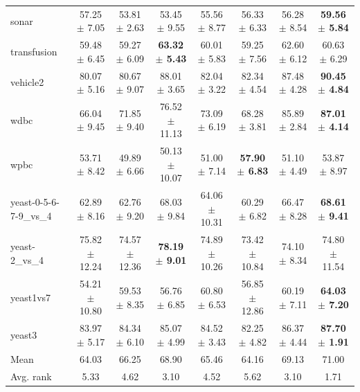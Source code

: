 \begin{table}[t]
\begin{tabular}{lccccccc}
sonar & 57.25 $\pm$ 7.05 & 53.81 $\pm$ 2.63 & 53.45 $\pm$ 9.55 & 55.56 $\pm$ 8.77 & 56.33 $\pm$ 6.33 & 56.28 $\pm$ 8.54 & \textbf{59.56 $\pm$ 5.84} \\
transfusion & 59.48 $\pm$ 6.45 & 59.27 $\pm$ 6.09 & \textbf{63.32 $\pm$ 5.43} & 60.01 $\pm$ 5.83 & 59.25 $\pm$ 7.56 & 62.60 $\pm$ 6.12 & 60.63 $\pm$ 6.29 \\
vehicle2 & 80.07 $\pm$ 5.16 & 80.67 $\pm$ 9.07 & 88.01 $\pm$ 3.65 & 82.04 $\pm$ 3.22 & 82.34 $\pm$ 4.54 & 87.48 $\pm$ 4.28 & \textbf{90.45 $\pm$ 4.84} \\
wdbc & 66.04 $\pm$ 9.45 & 71.85 $\pm$ 9.40 & 76.52 $\pm$ 11.13 & 73.09 $\pm$ 6.19 & 68.28 $\pm$ 3.81 & 85.89 $\pm$ 2.84 & \textbf{87.01 $\pm$ 4.14} \\
wpbc & 53.71 $\pm$ 8.42 & 49.89 $\pm$ 6.66 & 50.13 $\pm$ 10.07 & 51.00 $\pm$ 7.14 & \textbf{57.90 $\pm$ 6.83} & 51.10 $\pm$ 4.49 & 53.87 $\pm$ 8.97 \\
yeast-0-5-6-7-9\_vs\_4 & 62.89 $\pm$ 8.16 & 62.76 $\pm$ 9.20 & 68.03 $\pm$ 9.84 & 64.06 $\pm$ 10.31 & 60.29 $\pm$ 6.82 & 66.47 $\pm$ 8.28 & \textbf{68.61 $\pm$ 9.41} \\
yeast-2\_vs\_4 & 75.82 $\pm$ 12.24 & 74.57 $\pm$ 12.36 & \textbf{78.19 $\pm$ 9.01} & 74.89 $\pm$ 10.26 & 73.42 $\pm$ 10.84 & 74.10 $\pm$ 8.34 & 74.80 $\pm$ 11.54 \\
yeast1vs7 & 54.21 $\pm$ 10.80 & 59.53 $\pm$ 8.35 & 56.76 $\pm$ 6.85 & 60.80 $\pm$ 6.53 & 56.85 $\pm$ 12.86 & 60.19 $\pm$ 7.11 & \textbf{64.03 $\pm$ 7.20} \\
yeast3 & 83.97 $\pm$ 5.17 & 84.34 $\pm$ 6.10 & 85.07 $\pm$ 4.99 & 84.52 $\pm$ 3.43 & 82.25 $\pm$ 4.82 & 86.37 $\pm$ 4.44 & \textbf{87.70 $\pm$ 1.91} \\
\midrule
Mean & 64.03 & 66.25 & 68.90 & 65.46 & 64.16 & 69.13 & 71.00 \\
Avg. rank & 5.33 & 4.62 & 3.10 & 4.52 & 5.62 & 3.10 & 1.71 \\
\bottomrule
\end{tabular}
\end{table}